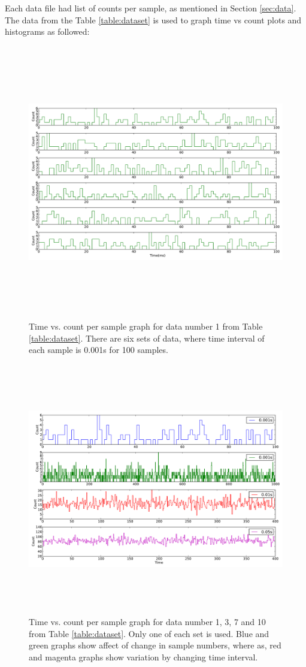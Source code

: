 \documentclass[a4paper,12pt]{article}
\begin{document}
Each data file had list of counts per sample, as mentioned in Section \ref{sec:data}. The data from the Table \ref{table:dataset} is used to graph time vs count plots and histograms as followed:
\begin{figure}[H]
\centering
\includegraphics[angle=0,height=12cm,width=15.5cm]{graphs/task1.pdf}
\caption{Time vs. count per sample graph for data number 1 from Table \ref{table:dataset}. There are six sets of data, where time interval of each sample is 0.001s for 100 samples.}
\label{fig:task1_plots}
\end{figure}

\begin{figure}[H]
\centering
\includegraphics[angle=0,height=11cm,width=15.5cm]{graphs/diff_plots.pdf}
\caption{Time vs. count per sample graph for data number 1, 3, 7 and 10 from Table \ref{table:dataset}. Only one of each set is used. Blue and green graphs show affect of change in sample numbers, where as, red and magenta graphs show variation by changing time interval.}
\label{fig:diff_plot}
\end{figure}
\end{document}
